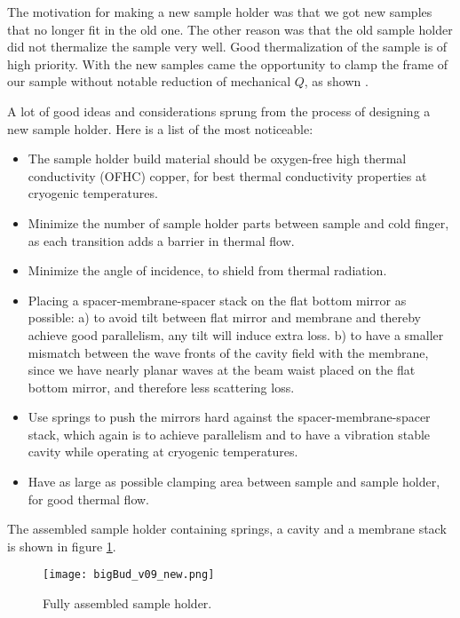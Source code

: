 The motivation for making a new sample holder was that we got new samples that no longer fit in the old one. The other reason was that the old sample holder did not thermalize the sample very well. Good thermalization of the sample is of high priority. With the new samples came the opportunity to clamp the frame of our sample without notable reduction of mechanical $Q$, as shown \cite{tsaturyan2014}.

A lot of good ideas and considerations sprung from the process of designing a new sample holder. Here is a list of the most noticeable:

\begin{itemize}
\item The sample holder build material should be oxygen-free high thermal conductivity (OFHC) copper, for best thermal conductivity properties at cryogenic temperatures.
\item Minimize the number of sample holder parts between sample and cold finger, as each transition adds a barrier in thermal flow.
\item Minimize the angle of incidence, to shield from thermal radiation.
\item Placing a spacer-membrane-spacer stack on the flat bottom mirror as possible: a) to avoid tilt between flat mirror and membrane and thereby achieve good parallelism, any tilt will induce extra loss. b) to have a smaller mismatch between the wave fronts of the cavity field with the membrane, since we have nearly planar waves at the beam waist placed on the flat bottom mirror, and therefore less scattering loss.
\item Use springs to push the mirrors hard against the spacer-membrane-spacer stack, which again is to achieve parallelism and to have a vibration stable cavity while operating at cryogenic temperatures.
\item Have as large as possible clamping area between sample and sample holder, for good thermal flow.
\end{itemize}

The assembled sample holder containing springs, a cavity and a membrane stack is shown in figure \ref{fig:sample_holder_tilt}.

\begin{figure}[H]
\centering
\texttt{[image: bigBud\_v09\_new.png]}
\caption{Fully assembled sample holder.}
\label{fig:sample_holder_tilt}
\end{figure}

